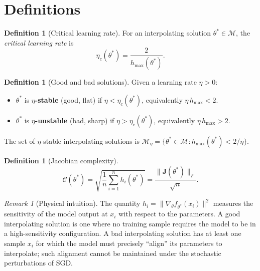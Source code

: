 \documentclass[11pt,a4paper]{article}
\theoremstyle{definition}
\newtheorem{definition}[theorem]{Definition}
\theoremstyle{remark}
\newtheorem{remark}[theorem]{Remark}
\newcommand{\cM}{\mathcal{M}}
\newcommand{\cC}{\mathcal{C}}
\newcommand{\bJ}{\mathbf{J}}
\begin{document}
\section{Definitions}\label{sec:definitions}

\begin{definition}[Critical learning rate]\label{def:eta-c}
  For an interpolating solution $\theta^* \in \cM$, the \emph{critical learning rate}
  is
  \[
    \eta_c(\theta^*) = \frac{2}{h_{\max}(\theta^*)}.
  \]
\end{definition}

\begin{definition}[Good and bad solutions]\label{def:good-bad}
  Given a learning rate $\eta > 0$:
  \begin{itemize}
    \item $\theta^*$ is \textbf{$\eta$-stable} (good, flat) if
      $\eta < \eta_c(\theta^*)$, equivalently $\eta\, h_{\max} < 2$.
    \item $\theta^*$ is \textbf{$\eta$-unstable} (bad, sharp) if
      $\eta > \eta_c(\theta^*)$, equivalently $\eta\, h_{\max} > 2$.
  \end{itemize}
  The set of $\eta$-stable interpolating solutions is
  $\cM_\eta = \{\theta^* \in \cM : h_{\max}(\theta^*) < 2/\eta\}$.
\end{definition}

\begin{definition}[Jacobian complexity]\label{def:jac-complex}
  \[
    \cC(\theta^*) = \sqrt{\frac{1}{n}\sum_{i=1}^n h_i(\theta^*)}
    = \frac{\|\bJ(\theta^*)\|_F}{\sqrt{n}}.
  \]
\end{definition}

\begin{remark}[Physical intuition]\label{rem:intuition}
  The quantity $h_i = \|\nabla_\theta f_{\theta^*}(x_i)\|^2$ measures the sensitivity
  of the model output at $x_i$ with respect to the parameters.  A good interpolating
  solution is one where no training sample requires the model to be in a
  high-sensitivity configuration.  A bad interpolating solution has at least one
  sample $x_i$ for which the model must precisely ``align'' its parameters to
  interpolate; such alignment cannot be maintained under the stochastic perturbations
  of SGD.
\end{remark}

\end{document}
